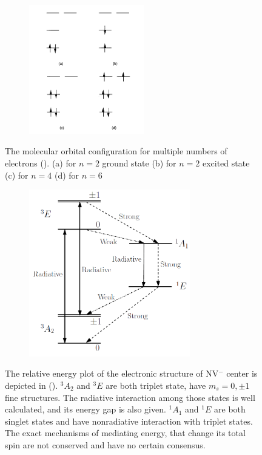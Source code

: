 \documentclass{article}
\begin{document}
\begin{figure}[ht]
    \centering
    \begin{subfigure}[b]{5cm}
        \centering
        \includegraphics[width=5cm]{./figs/six_electron_model.png}
    \end{subfigure}
    \hfill
    \caption{
        The molecular orbital configuration for multiple numbers of electrons (\cite{sixelectron}).
        (a) for $n = 2$ ground state (b) for $n = 2$ excited state (c) for $n = 4$ (d) for $n = 6$
    }
    \label{fig: six electron energy states}
\end{figure}
\begin{figure}[ht]
    \centering
    \begin{subfigure}[b]{7cm}
        \centering
        \includegraphics[width=7cm]{./figs/electronic structure.png}
    \end{subfigure}
    \hfill
    \caption{
        The relative energy plot of the electronic structure of NV$ ^-$ center is depicted in (\cite{nv}).
        $ ^3A_2$ and $ ^3E$ are both triplet state, have $m_s = 0, \pm 1$ fine structures.
        The radiative interaction among those states is well calculated, and its energy gap is also given.
        $ ^1A_1$ and $ ^1E$ are both singlet states and have nonradiative interaction with triplet states.
        The exact mechanisms of mediating energy, that change its total spin are not conserved and have no certain consensus.
    }
    \label{fig: electronic structure}
\end{figure}
\end{document}
